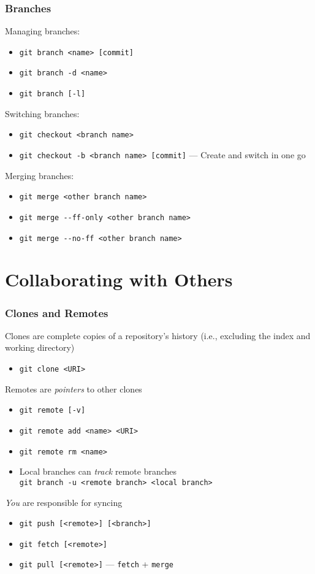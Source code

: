\documentclass{beamer}
\begin{document}
\begin{frame}
 \frametitle{Branches}

 Managing branches:
 \begin{itemize}
  \item \texttt{git branch <name> [commit]}
  \item \texttt{git branch -d <name>}
  \item \texttt{git branch [-l]}
 \end{itemize}

 \pause
 Switching branches:
 \begin{itemize}
  \item \texttt{git checkout <branch name>}
  \item \texttt{git checkout -b <branch name> [commit]} --- Create and switch
        in one go
 \end{itemize}

 \pause
 Merging branches:
 \begin{itemize}
  \item \texttt{git merge <other branch name>}
  \item \texttt{git merge \alert{-{}-ff-only} <other branch name>}
  \item \texttt{git merge \alert{-{}-no-ff} <other branch name>}
 \end{itemize}
\end{frame}

\section{Collaborating with Others}

\begin{frame}
 \frametitle{Clones and Remotes}

 Clones are complete copies of a repository's history (i.e., excluding the
 index and working directory)
 \pause
 \begin{itemize}
  \item \texttt{git clone <URI>}
 \end{itemize}

 \pause
 Remotes are \emph{pointers} to other clones
 \pause
 \begin{itemize}
  \item \texttt{git remote [-v]}
  \item \texttt{git remote add <name> <URI>}
  \item \texttt{git remote rm <name>}
  \item Local branches can \emph{track} remote branches\\
        \texttt{git branch -u <remote branch> <local branch>}
 \end{itemize}

 \pause
 \emph{You} are responsible for syncing
 \begin{itemize}
  \item \texttt{git push [<remote>] [<branch>]}
  \item \texttt{git fetch [<remote>]}
  \item \texttt{git pull [<remote>]} --- \texttt{fetch} + \texttt{merge}
 \end{itemize}
\end{frame}
\end{document}
